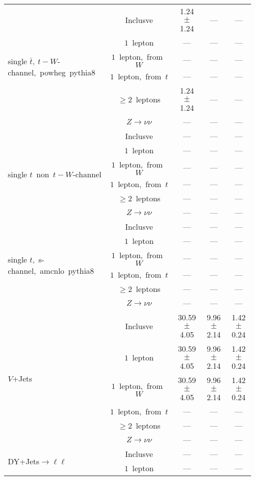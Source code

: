 \documentclass{article}
\begin{document}
\begin{longtable}{|l|c|c|c|c|}
\hline 
\multirow{6}{*}{single $\bar{t},~t-W$-channel,~powheg~pythia8} & Inclusve  & 1.24 $\pm$ 1.24  & ---  & --- \\* 
 & $1$~lepton  & ---  & ---  & --- \\* 
 & $1$~lepton,~from~$W$  & ---  & ---  & --- \\* 
 & $1$~lepton,~from~$t$  & ---  & ---  & --- \\* 
 & $\ge2$~leptons  & 1.24 $\pm$ 1.24  & ---  & --- \\* 
 & $Z\rightarrow\nu\nu$  & ---  & ---  & --- \\* 
\hline 
\multirow{6}{*}{single $t$~non~$t-W$-channel} & Inclusve  & ---  & ---  & --- \\* 
 & $1$~lepton  & ---  & ---  & --- \\* 
 & $1$~lepton,~from~$W$  & ---  & ---  & --- \\* 
 & $1$~lepton,~from~$t$  & ---  & ---  & --- \\* 
 & $\ge2$~leptons  & ---  & ---  & --- \\* 
 & $Z\rightarrow\nu\nu$  & ---  & ---  & --- \\* 
\hline 
\multirow{6}{*}{single $t$,~s-channel,~amcnlo~pythia8} & Inclusve  & ---  & ---  & --- \\* 
 & $1$~lepton  & ---  & ---  & --- \\* 
 & $1$~lepton,~from~$W$  & ---  & ---  & --- \\* 
 & $1$~lepton,~from~$t$  & ---  & ---  & --- \\* 
 & $\ge2$~leptons  & ---  & ---  & --- \\* 
 & $Z\rightarrow\nu\nu$  & ---  & ---  & --- \\* 
\hline 
\multirow{6}{*}{$V$+Jets} & Inclusve  & 30.59 $\pm$ 4.05  & 9.96 $\pm$ 2.14  & 1.42 $\pm$ 0.24 \\* 
 & $1$~lepton  & 30.59 $\pm$ 4.05  & 9.96 $\pm$ 2.14  & 1.42 $\pm$ 0.24 \\* 
 & $1$~lepton,~from~$W$  & 30.59 $\pm$ 4.05  & 9.96 $\pm$ 2.14  & 1.42 $\pm$ 0.24 \\* 
 & $1$~lepton,~from~$t$  & ---  & ---  & --- \\* 
 & $\ge2$~leptons  & ---  & ---  & --- \\* 
 & $Z\rightarrow\nu\nu$  & ---  & ---  & --- \\* 
\hline 
\multirow{6}{*}{DY+Jets$\rightarrow\ell\ell$} & Inclusve  & ---  & ---  & --- \\* 
 & $1$~lepton  & ---  & ---  & --- \\* 

\end{longtable}
\end{document}
